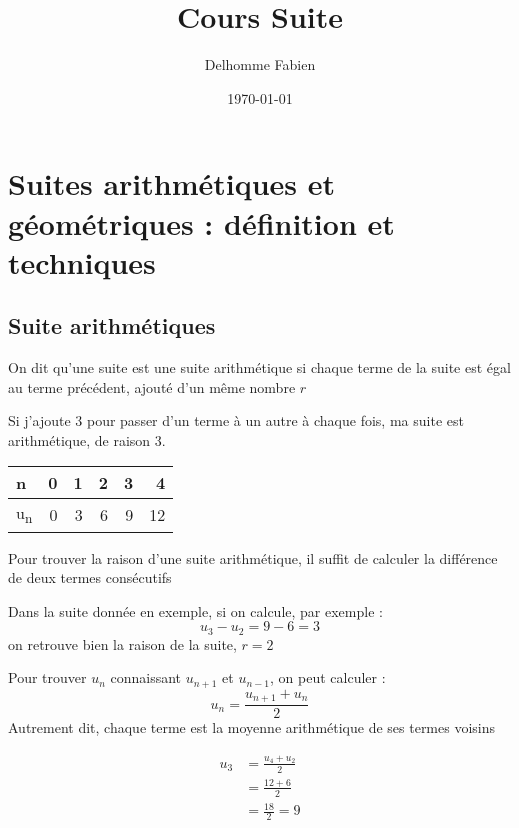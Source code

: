 \documentclass[11pt]{article}
\author{Delhomme Fabien}
\date{\today}
\title{Cours Suite}
\begin{document}
\maketitle
\section{Suites arithmétiques et géométriques : définition et techniques}
\label{sec:orge4e8058}
\subsection{Suite arithmétiques}
\label{sec:org81635d1}
\begin{prop}
On dit qu'une suite est une suite arithmétique si chaque terme de la suite est égal au terme précédent, ajouté d'un même nombre $r$
\end{prop}

\begin{ex}
    Si j'ajoute $3$ pour passer d'un terme à un autre à chaque fois, ma suite est arithmétique, de raison $3$.
\end{ex}

\begin{ex}
\begin{center}
\begin{tabular}{lrrrrr}
\hline
n & 0 & 1 & 2 & 3 & 4\\
\hline
u\textsubscript{n} & 0 & 3 & 6 & 9 & 12\\
\hline
\end{tabular}
\end{center}
\end{ex}

\begin{prop}
    Pour trouver la raison d'une suite arithmétique, il suffit de calculer la différence de deux termes consécutifs
\end{prop}

\begin{ex}
Dans la suite donnée en exemple, si on calcule, par exemple :
\[
u_3 - u_2 = 9 - 6 = 3
\]
on retrouve bien la raison de la suite, $r=2$
\end{ex}

\begin{prop}
    Pour trouver $u_n$ connaissant $u_{n+1}$ et $u_{n-1}$, on peut calculer :
\[
u_n = \frac{u_{n+1} + u_n}{2}
\]
Autrement dit, chaque terme est la moyenne arithmétique de ses termes voisins
\end{prop}

\begin{ex}
  \begin{align*}
    u_3 &= \frac{u_4 + u_2}{2}\\
        &= \frac{12 + 6}{2} \\
        &= \frac{18}{2} = 9
  \end{align*}
\end{ex}
\end{document}
